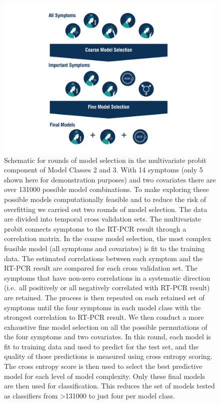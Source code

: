 \documentclass[]{elsarticle} %
\begin{document}
\begin{figure}
\hypertarget{fig:modsel-flowchart}{%
\centering
\includegraphics[width=4.375in,height=3.10417in]{MainTextFigs/ModelSelectionFlowchart.pdf}
\caption{Schematic for rounds of model selection in the multivariate
probit component of Model Classes 2 and 3. With 14 symptoms (only 5
shown here for demonstration purposes) and two covariates there are over
131000 possible model combinations. To make exploring these possible
models computationally feasible and to reduce the risk of overfitting we
carried out two rounds of model selection. The data are divided into
temporal cross validation sets. The multivariate probit connects
symptoms to the RT-PCR result through a correlation matrix. In the
coarse model selection, the most complex feasible model (all symptoms
and covariates) is fit to the training data. The estimated correlations
between each symptom and the RT-PCR result are compared for each cross
validation set. The symptoms that have non-zero correlations in a
systematic direction (i.e.~all positively or all negatively correlated
with RT-PCR result) are retained. The process is then repeated on each
retained set of symptoms until the four symptoms in each model class
with the strongest correlation to RT-PCR result. We then conduct a more
exhaustive fine model selection on all the possible permutations of the
four symptoms and two covariates. In this round, each model is fit to
training data and used to predict for the test set, and the quality of
those predictions is measured using cross entropy scoring. The cross
entropy score is then used to select the best predictive model for each
level of model complexity. Only these final models are then used for
classification. This reduces the set of models tested as classifiers
from \textgreater131000 to just four per model
class.}\label{fig:modsel-flowchart}
}
\end{figure}
\end{document}
